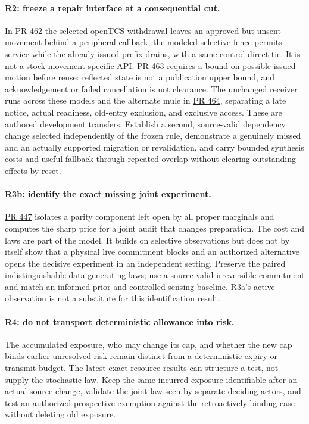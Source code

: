 \documentclass[11pt]{article}
\newcommand{\pr}[1]{\href{https://github.com/eternal-november/eos-research-programmes/pull/#1}{PR #1}}
\begin{document}
\paragraph{R2: freeze a repair interface at a consequential cut.}
In \pr{462} the selected openTCS withdrawal leaves an approved but unsent movement behind a peripheral callback; the modeled selective fence permits service while the already-issued prefix drains, with a same-control direct tie. It is not a stock movement-specific API. \pr{463} requires a bound on possible issued motion before reuse: reflected state is not a publication upper bound, and acknowledgement or failed cancellation is not clearance. The unchanged receiver runs across these models and the alternate mule in \pr{464}, separating a late notice, actual readiness, old-entry exclusion, and exclusive access. These are authored development transfers. Establish a second, source-valid dependency change selected independently of the frozen rule, demonstrate a genuinely missed and an actually supported migration or revalidation, and carry bounded synthesis costs and useful fallback through repeated overlap without clearing outstanding effects by reset.

\paragraph{R3b: identify the exact missing joint experiment.}
\pr{447} isolates a parity component left open by all proper marginals and computes the sharp price for a joint audit that changes preparation. The cost and laws are part of the model. It builds on selective observations but does not by itself show that a physical live commitment blocks and an authorized alternative opens the decisive experiment in an independent setting. Preserve the paired indistinguishable data-generating laws; use a source-valid irreversible commitment and match an informed prior and controlled-sensing baseline. R3a's active observation is not a substitute for this identification result.

\paragraph{R4: do not transport deterministic allowance into risk.}
The accumulated exposure, who may change its cap, and whether the new cap binds earlier unresolved risk remain distinct from a deterministic expiry or transmit budget. The latest exact resource results can structure a test, not supply the stochastic law. Keep the same incurred exposure identifiable after an actual source change, validate the joint law seen by separate deciding actors, and test an authorized prospective exemption against the retroactively binding case without deleting old exposure.
\end{document}
